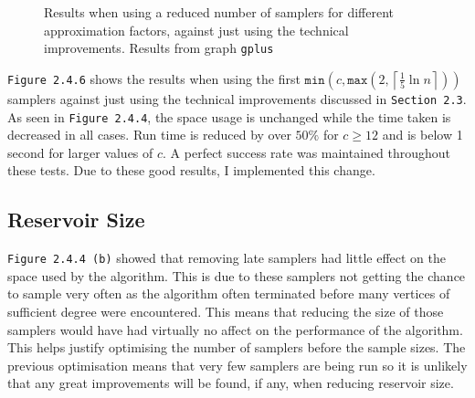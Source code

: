 \documentclass[11pt,twoside,a4paper]{report}
\begin{document}
\begin{figure}[H]
	\label{Figure 7}
	\caption{Results when using a reduced number of samplers for different approximation factors, against just using the technical improvements. Results from graph \texttt{gplus}}
\end{figure}

\par \texttt{Figure 2.4.6} shows the results when using the first $\mathtt{min}\left(c,\mathtt{max}\left(2,\left\lceil\frac15\ln n\right\rceil\right)\right)$ samplers against just using the technical improvements discussed in \texttt{Section 2.3}. As seen in \texttt{Figure 2.4.4}, the space usage is unchanged while the time taken is decreased in all cases. Run time is reduced by over $50\%$ for $c\geq 12$ and is below 1 second for larger values of $c$. A perfect success rate was maintained throughout these tests. Due to these good results, I implemented this change.
\subsection{Reservoir Size}

\par \texttt{Figure 2.4.4 (b)} showed that removing late samplers had little effect on the space used by the algorithm. This is due to these samplers not getting the chance to sample very often as the algorithm often terminated before many vertices of sufficient degree were encountered. This means that reducing the size of those samplers would have had virtually no affect on the performance of the algorithm. This helps justify optimising the number of samplers before the sample sizes. The previous optimisation means that very few samplers are being run so it is unlikely that any great improvements will be found, if any, when reducing reservoir size.
\end{document}

